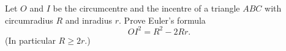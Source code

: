 Let $O$ and $I$ be the circumcentre and the incentre of a triangle $ABC$ with circumradius $R$ and inradius $r$. Prove Euler's formula
\[OI^2=R^2-2Rr.\]
(In particular $R\ge2r$.)
